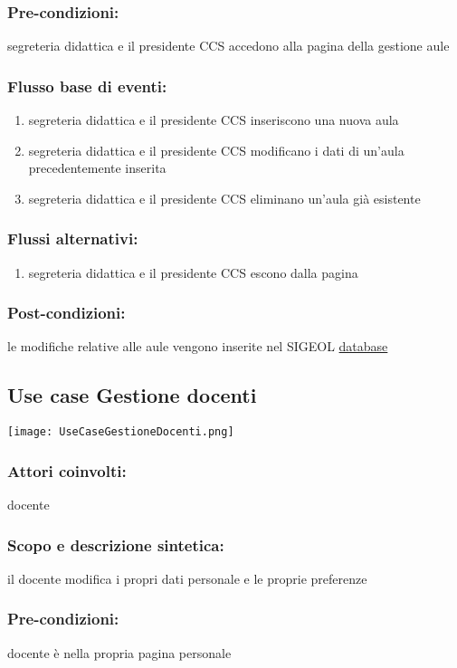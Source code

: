 \documentclass[11pt,a4paper]{article}
\begin{document}
\subsubsection*{Pre-condizioni:}
segreteria didattica e il presidente CCS accedono alla pagina della gestione aule
\subsubsection*{Flusso base di eventi:}
\begin{enumerate}
 \item segreteria didattica e il presidente CCS inseriscono una nuova aula
 \item segreteria didattica e il presidente CCS modificano i dati di un'aula precedentemente inserita
 \item segreteria didattica e il presidente CCS eliminano un'aula già esistente
\end{enumerate}
\subsubsection*{Flussi alternativi:}
\begin{enumerate} 
\item segreteria didattica e il presidente CCS escono dalla pagina
\end{enumerate}
\subsubsection*{Post-condizioni:}
le modifiche relative alle aule vengono inserite nel SIGEOL \underline{database}
\subsection{Use case Gestione docenti}
\begin{center} 
 \texttt{[image: UseCaseGestioneDocenti.png]}
\end{center}
\subsubsection*{Attori coinvolti:}
docente
\subsubsection*{Scopo e descrizione sintetica:}
il docente modifica i propri dati personale e le proprie preferenze
\subsubsection*{Pre-condizioni:}
docente è nella propria pagina personale
\end{document}

